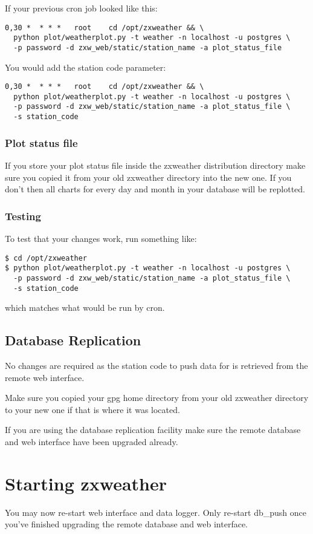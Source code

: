 \documentclass[a4paper,10pt,draft]{book}
\newcommand{\partnumber}{\ifthenelse{\isundefined{\projectnum}}{}{\projectnum-\docnum	\ifthenelse{\equal{\docrev}{001}}{}{.\docrev}}}
\newcommand*\cleartoleftpage{%
  \clearpage
  \ifodd\value{page}\hbox{}\newpage\fi
}
\begin{document}
If your previous cron job looked like this:
\begin{verbatim}
0,30 *  * * *   root    cd /opt/zxweather && \
  python plot/weatherplot.py -t weather -n localhost -u postgres \
  -p password -d zxw_web/static/station_name -a plot_status_file
\end{verbatim}

You would add the station code parameter:
\begin{verbatim}
0,30 *  * * *   root    cd /opt/zxweather && \
  python plot/weatherplot.py -t weather -n localhost -u postgres \
  -p password -d zxw_web/static/station_name -a plot_status_file \
  -s station_code
\end{verbatim}

\subsubsection{Plot status file}
If you store your plot status file inside the zxweather distribution directory make sure you copied it from your old zxweather directory into the new one. If you don't then all charts for every day and month in your database will be replotted.

\subsubsection{Testing}
To test that your changes work, run something like:
\begin{verbatim}
$ cd /opt/zxweather
$ python plot/weatherplot.py -t weather -n localhost -u postgres \
  -p password -d zxw_web/static/station_name -a plot_status_file \
  -s station_code
\end{verbatim}
which matches what would be run by cron.

\subsection{Database Replication}
No changes are required as the station code to push data for is retrieved from the remote web interface.

Make sure you copied your gpg home directory from your old zxweather directory to your new one if that is where it was located.

If you are using the database replication facility make sure the remote database and web interface have been upgraded already.

\section{Starting zxweather}
You may now re-start web interface and data logger. Only re-start db\_push once you've finished upgrading the remote database and web interface.


\cleartoleftpage
\thispagestyle{empty}
\begin{flushright}
\null
\vfill
\tt \partnumber
\end{flushright}
\end{document}
